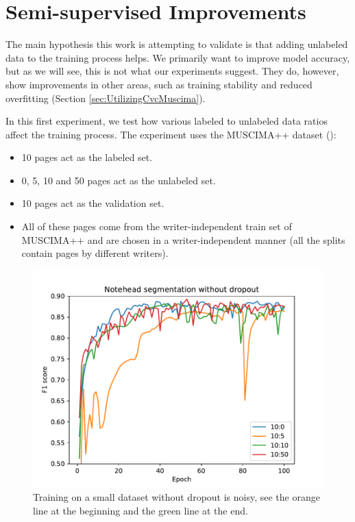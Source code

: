 \section{Semi-supervised Improvements}
\label{sec:SemisupervisedImprovements}

The main hypothesis this work is attempting to validate is that adding unlabeled data to the training process helps. We primarily want to improve model accuracy, but as we will see, this is not what our experiments suggest. They do, however, show improvements in other areas, such as training stability and reduced overfitting (Section \ref{sec:UtilizingCvcMuscima}).

In this first experiment, we test how various labeled to unlabeled data ratios affect the training process. The experiment uses the MUSCIMA++ dataset (\cite{MuscimaPP}):

\begin{itemize}
    \item 10 pages act as the labeled set.
    \item 0, 5, 10 and 50 pages act as the unlabeled set.
    \item 10 pages act as the validation set.
    \item All of these pages come from the writer-independent train set of MUSCIMA++ and are chosen in a writer-independent manner (all the splits contain pages by different writers).
\end{itemize}

\begin{figure}[ht]
    \centering
    \includegraphics[width=140mm]{../../figures/01-exploration-noteheads/noteheads.pdf}
    \caption{Training on a small dataset without dropout is noisy, see the orange line at the beginning and the green line at the end.}
    \label{fig:ExplorationNoteheadsNoDropout}
\end{figure}

